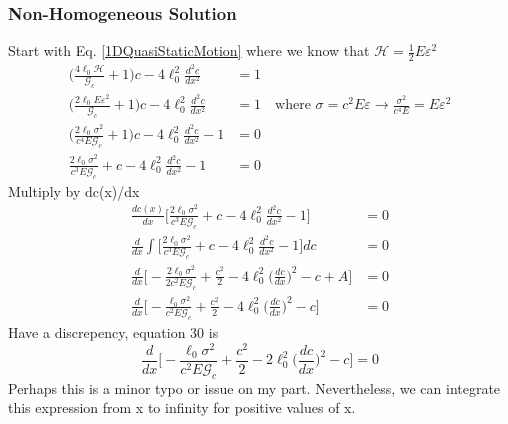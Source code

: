 \documentclass[12pt,3p]{article}
\numberwithin{equation}{section}
\begin{document}
\subsubsection{Non-Homogeneous Solution}
Start with Eq. \ref{1DQuasiStaticMotion} where we know that $\mathcal{H} = \frac{1}{2} E \varepsilon^2$
\begin{align*}
\bigg(\frac{4 \ell_0 \mathcal{H}}{\mathcal{G}_c} + 1 \bigg) c - 4 \ell_0^2 \frac{d^2 c }{d x^2} &= 1 \\
\bigg(\frac{2 \ell_0 E \varepsilon^2}{\mathcal{G}_c} + 1 \bigg) c - 4 \ell_0^2 \frac{d^2 c }{d x^2} &= 1 \quad \text{where } \sigma = c^2 E \varepsilon \rightarrow \frac{\sigma^2}{c^4 E} = E \varepsilon^2 \\
\bigg(\frac{2 \ell_0 \sigma^2}{c^4 E \mathcal{G}_c} + 1 \bigg) c - 4 \ell_0^2 \frac{d^2 c }{d x^2} -1 &= 0 \\
\frac{2 \ell_0 \sigma^2}{c^3 E \mathcal{G}_c} + c - 4 \ell_0^2 \frac{d^2 c }{d x^2} -1 &= 0
\end{align*}
Multiply by dc(x)/dx 
\begin{align*}
\frac{dc(x)}{dx} \bigg[ \frac{2 \ell_0 \sigma^2}{c^3 E \mathcal{G}_c} + c - 4 \ell_0^2 \frac{d^2 c }{d x^2} -1 \bigg] &= 0 \\
\frac{d}{dx} \int \bigg[ \frac{2 \ell_0 \sigma^2}{c^3 E \mathcal{G}_c} + c - 4 \ell_0^2 \frac{d^2 c }{d x^2} -1 \bigg] dc &= 0 \\
\frac{d}{dx} \bigg[ - \frac{2 \ell_0 \sigma^2}{2 c^2 E \mathcal{G}_c} + \frac{c^2}{2} - 4 \ell_0^2 \bigg( \frac{dc }{d x} \bigg)^2 - c + A \bigg] &= 0 \\
\frac{d}{dx} \bigg[ - \frac{\ell_0 \sigma^2}{c^2 E \mathcal{G}_c} + \frac{c^2}{2} - 4 \ell_0^2 \bigg( \frac{dc }{d x} \bigg)^2 -  c \bigg] &= 0
\end{align*}
Have a discrepency, equation 30 is 
\begin{equation}
\frac{d}{dx} \bigg[ - \frac{\ell_0 \sigma^2}{c^2 E \mathcal{G}_c} + \frac{c^2}{2} - 2 \ell_0^2 \bigg( \frac{dc }{d x} \bigg)^2 -  c  \bigg] = 0
\end{equation}
Perhaps this is a minor typo or issue on my part. Nevertheless, we can integrate this expression from x to infinity for positive values of x.
\end{document}
